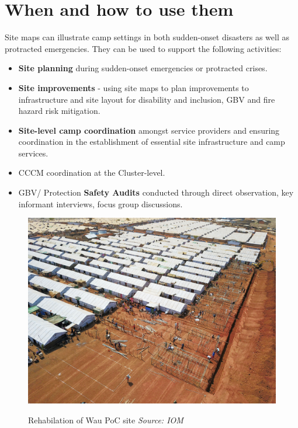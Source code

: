 \documentclass[
  a4paper,
  onecolumn,
  oneside]{book}
\begin{document}
\hypertarget{when-and-how-to-use-them}{%
\section*{When and how to use them}\label{when-and-how-to-use-them}}


Site maps can illustrate camp settings in both sudden-onset disasters as
well as protracted emergencies. They can be used to support the
following activities:

\begin{itemize}
\item
  \textbf{Site planning} during sudden-onset emergencies or protracted
  crises.
\item
  \textbf{Site improvements} - using site maps to plan improvements to
  infrastructure and site layout for disability and inclusion, GBV and
  fire hazard risk mitigation.
\item
  \textbf{Site-level camp coordination} amongst service providers and
  ensuring coordination in the establishment of essential site
  infrastructure and camp services.
\item
  CCCM coordination at the Cluster-level.
\item
  GBV/ Protection \textbf{Safety Audits} conducted through direct
  observation, key informant interviews, focus group discussions.
\end{itemize}

\begin{figure}

{\centering 

\href{images/wau1.jpg}{\includegraphics{./images/wau1.jpg}}

}

\caption{Rehabilation of Wau PoC site \emph{Source: IOM}}

\end{figure}
\end{document}
